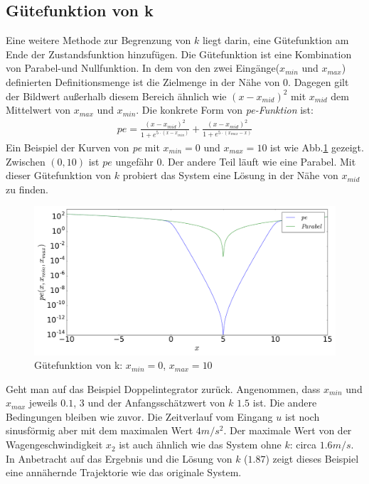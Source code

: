 \subsection{Gütefunktion von k}
\label{Gütefunktion_von_k}
Eine weitere Methode zur Begrenzung von $k$ liegt darin, eine Gütefunktion am Ende der Zustandsfunktion hinzufügen. Die Gütefunktion ist eine Kombination von Parabel-und Nullfunktion. In dem von den zwei Eingänge($x_{min}$ und $x_{max}$) definierten Definitionsmenge ist die Zielmenge in der Nähe von 0. Dagegen gilt der Bildwert außerhalb diesem Bereich ähnlich wie $(x-x_{mid})^{2}$ mit $x_{mid}$ dem Mittelwert von $x_{max}$ und $x_{min}$. Die konkrete Form von \emph{pe-Funktion} ist:
\begin{eqnarray}
pe = \frac{(x-x_{mid})^{2}}{1 + e^{5\cdot (x-x_{min})}} + \frac{(x-x_{mid})^{2}}{1 + e^{5\cdot (x_{max}-x)}}\label{eq:Gütefunktion}     
\end{eqnarray}
Ein Beispiel der Kurven von \emph{pe} mit $x_{min}=0$ und $x_{max}=10$ ist wie Abb.\ref{fig:Gütefunktion_von_k} gezeigt. Zwischen $(0,10)$ ist $pe$ ungefähr 0. Der andere Teil läuft wie eine Parabel. Mit dieser Gütefunktion von $k$ probiert das System eine Lösung in der Nähe von $x_{mid}$ zu finden.
\begin{figure}
	\centering
	\includegraphics[width=12cm]{bild/pe/pe.pdf}
	\caption{Gütefunktion von k: $x_{min}=0$, $x_{max}=10$}
	\label{fig:Gütefunktion_von_k}
\end{figure}
\begin{beispiel}
	Geht man auf das Beispiel Doppelintegrator zurück. Angenommen, dass $x_{min}$ und $x_{max}$ jeweils $0.1$, $3$ und der Anfangsschätzwert von $k$ $1.5$ ist. Die andere Bedingungen bleiben wie zuvor.
	Die Zeitverlauf vom Eingang $u$ ist noch sinusförmig aber mit dem maximalen Wert $4m/s^{2}$. Der maximale Wert von der Wagengeschwindigkeit $x_{2}$ ist auch ähnlich wie das System ohne $k$: circa $1.6m/s$. In Anbetracht auf das Ergebnis und die Lösung von $k$ ($1.87$) zeigt dieses Beispiel eine annähernde Trajektorie wie das originale System. 
\end{beispiel}


